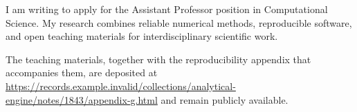 \documentclass[family=academic]{careerdossier-letter}
\begin{document}
\MakeCDossierLetterhead

I am writing to apply for the Assistant Professor position in Computational
Science. My research combines reliable numerical methods, reproducible
software, and open teaching materials for interdisciplinary scientific work.

The teaching materials, together with the reproducibility appendix that
accompanies them, are deposited at
\url{https://records.example.invalid/collections/analytical-engine/notes/1843/appendix-g.html}
and remain publicly available.

\MakeCDossierClosing
\end{document}

